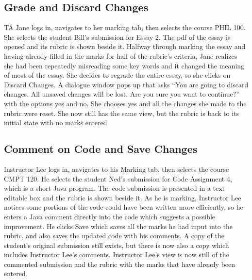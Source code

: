 \documentclass{article}
\begin{document}
\subsection{Grade and Discard Changes}
TA Jane logs in, navigates to her marking tab, then selects the course PHIL 100. She
selects the student Bill’s submission for Essay 2. The pdf of the essay is opened and
its rubric is shown beside it. Halfway through marking the essay and having already
filled in the marks for half of the rubric’s criteria, Jane realizes she had been repeatedly
misreading some key words and it changed the meaning of most of the essay. She decides
to regrade the entire essay, so she clicks on Discard Changes. A dialogue window pops
up that asks “You are going to discard changes. All unsaved changes will be lost. Are you
sure you want to continue?” with the options yes and no. She chooses yes and all the
changes she made to the rubric were reset. She now still has the same view, but the
rubric is back to its initial state with no marks entered.

\subsection{Comment on Code and Save Changes}
Instructor Lee logs in, navigates to his Marking tab, then selects the course CMPT 120.
He selects the student Ned’s submission for Code Assignment 4, which is a short Java
program. The code submission is presented in a text-editable box and the rubric is shown
beside it. As he is marking, Instructor Lee notices some portions of the code could have
been written more efficiently, so he enters a Java comment directly into the code which
suggests a possible improvement. He clicks Save which saves all the marks he had input
into the rubric, and also saves the updated code with his comments. A copy of the student’s
original submission still exists, but there is now also a copy which includes Instructor Lee’s
comments. Instructor Lee’s view is now still of the commented submission and the rubric with
the marks that have already been entered.
\end{document}
